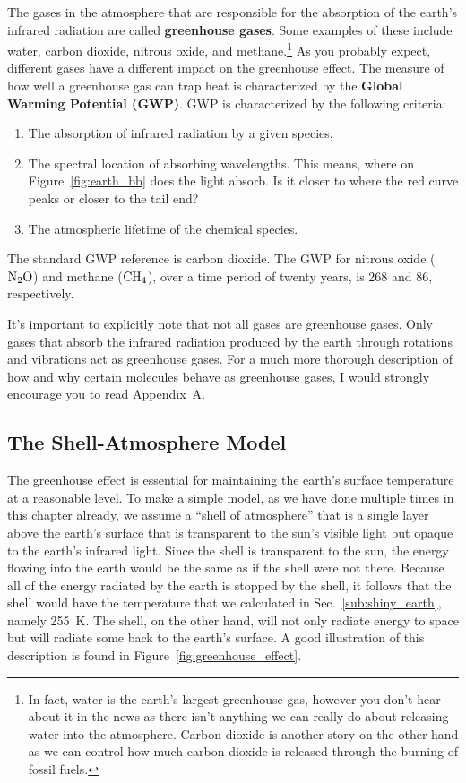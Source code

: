     The gases in the atmosphere that are responsible for the absorption of the earth's infrared radiation are called \textbf{greenhouse gases}. Some examples of these include water, carbon dioxide, nitrous oxide, and methane.\footnote{In fact, water is the earth's largest greenhouse gas, however you don't hear about it in the news as there isn't anything we can really do about releasing water into the atmosphere. Carbon dioxide is another story on the other hand as we can control how much carbon dioxide is released through the burning of fossil fuels.} As you probably expect, different gases have a different impact on the greenhouse effect. The measure of how well a greenhouse gas can trap heat is characterized by the \textbf{Global Warming Potential (GWP)}. GWP is characterized by the following criteria:
    \begin{enumerate}
        \item The absorption of infrared radiation by a given species,
        \item The spectral location of absorbing wavelengths. This means, where on Figure~\ref{fig:earth_bb} does the light absorb. Is it closer to where the red curve peaks or closer to the tail end? 
        \item The atmospheric lifetime of the chemical species.
    \end{enumerate}
    The standard GWP reference is carbon dioxide. The GWP for nitrous oxide ({$\rm N_2O$}) and methane ({$\rm CH_4$}), over a time period of twenty years, is 268 and 86, respectively. 
    
    It's important to explicitly note that not all gases are greenhouse gases. Only gases that absorb the infrared radiation produced by the earth through rotations and vibrations act as greenhouse gases. For a much more thorough description of how and why certain molecules behave as greenhouse gases, I would strongly encourage you to read Appendix~A. 
    

    \subsection{The Shell-Atmosphere Model} %
    \label{sub:shell_atm}

    The greenhouse effect is essential for maintaining the earth's surface temperature at a reasonable level. To make a simple model, as we have done multiple times in this chapter already, we assume a ``shell of atmosphere'' that is a single layer above the earth's surface that is transparent to the sun's visible light but opaque to the earth's infrared light. Since the shell is transparent to the sun, the energy flowing into the earth would be the same as if the shell were not there. Because all of the energy radiated by the earth is stopped by the shell, it follows that the shell would have the temperature that we calculated in Sec.~\ref{sub:shiny_earth}, namely \SI{255}{\kelvin}. The shell, on the other hand, will not only radiate energy to space but will radiate some back to the earth's surface. A good illustration of this description is found in Figure~\ref{fig:greenhouse_effect}. 

